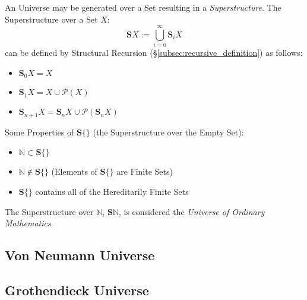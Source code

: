 \documentclass{article}
\begin{document}
An Universe may be generated over a Set resulting in a
\emph{Superstructure}. The Superstructure over a Set $X$:
\[
    \mathbf{S}X := \bigcup^{\infty}_{i=0}\mathbf{S}_i X
\]
can be defined by Structural Recursion
(\S\ref{subsec:recursive_definition}) as follows:
\begin{itemize}

\item $\mathbf{S}_0 X = X$
\item $\mathbf{S}_1 X = X \cup \mathcal{P}(X)$
\item $\mathbf{S}_{n+1} X =
    \mathbf{S}_n X \cup \mathcal{P}(\mathbf{S}_n X)$

\end{itemize}
Some Properties of $\mathbf{S}\{\}$ (the Superstructure over the Empty
Set):
\begin{itemize}

\item $\mathbb{N} \subset \mathbf{S}\{\}$
\item $\mathbb{N} \notin \mathbf{S}\{\}$ (Elements of $\mathbf{S}\{\}$
  are Finite Sets)
\item $\mathbf{S}\{\}$ contains all of the Hereditarily Finite Sets

\end{itemize}

The Superstructure over $\mathbb{N}$, $\mathbf{S}\mathbb{N}$, is
considered the \emph{Universe of Ordinary Mathematics}.



\subsection{Von Neumann Universe}\label{subsec:vonneumann_universe}

\subsection{Grothendieck Universe}\label{subsec:grothendieck_universe}




\end{document}
